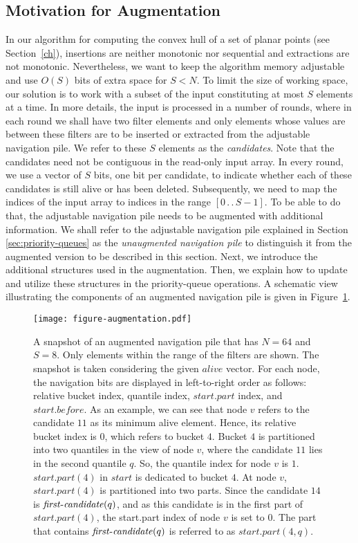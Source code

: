 \documentclass[final,onetabnum,onefignum,onethmnum]{siamltex}
\newcommand{\FirstCandidate}{\mbox{$\mathit{first}\mbox{\rm -}\mathit{candidate}$}}
\newcommand{\twodots}{\,.\,.\,}
\begin{document}
\subsection{Motivation for Augmentation} 
In our algorithm for computing the convex hull of a set of planar points (see Section~\ref{ch}), 
insertions are neither monotonic nor sequential and extractions are not monotonic. 
Nevertheless, we want to keep the algorithm memory adjustable and use $O(S)$ bits of extra
space for $S < N$.  To limit the size of working space, our
solution is to work with a subset of the input constituting at most
$S$ elements at a time. In more details, the input is processed in a
number of rounds, where in each round we shall have two filter
elements and only elements whose values are between these filters are
to be inserted or extracted from the adjustable navigation pile. We
refer to these $S$ elements as the \emph{candidates}.  Note that
the candidates need not be contiguous in the read-only input array.  
In every round, we use a vector of $S$ bits, one bit per candidate, 
to indicate whether each of these candidates is still alive or has been deleted.
Subsequently, we need to map the indices of the input array to
indices in the range $[0 \twodots S-1]$. To be able to do that,
the adjustable navigation pile needs to be augmented with additional
information. We shall refer to the adjustable navigation pile explained in
Section \ref{sec:priority-queues} as the \emph{unaugmented navigation
  pile} to distinguish it from the augmented version to be described
in this section.  Next, we introduce the additional structures used in
the augmentation. Then, we explain how to update and utilize these
structures in the priority-queue operations.  A schematic view
illustrating the components of an augmented navigation pile is given in
Figure~\ref{ANP}.

\begin{figure}[t!]
\centerline{\texttt{[image: figure-augmentation.pdf]}}
\caption{A snapshot of an augmented navigation pile that has $N = 64$
  and $S = 8$. Only elements within the range of the filters are
  shown. The snapshot is taken considering the given $\mathit{alive}$
  vector. For each node, the navigation bits are displayed in
  left-to-right order as follows: relative bucket index, quantile
  index, $\mathit{start.part}$ index, and $\mathit{start.before}$. As
  an example, we can see that node $v$ refers to the candidate $11$ as
  its minimum alive element. Hence, its relative bucket index is $0$,
  which refers to bucket $4$. Bucket $4$ is partitioned into two
  quantiles in the view of node $v$, where the candidate $11$ lies in
  the second quantile $q$. So, the quantile index for node $v$ is
  $1$. $\mathit{start.part}(4)$ in $\mathit{start}$ is dedicated to
  bucket $4$. At node $v$, $\mathit{start.part}(4)$ is partitioned
  into two parts.  Since the candidate $14$ is 
  $\FirstCandidate(q)$, and as this candidate is in the
  first part of $\mathit{start.part}(4)$, the start.part index of node
  $v$ is set to $0$.  The part that contains $\FirstCandidate(q)$
  is referred to as $\mathit{start.part}(4,q)$.}	
\label{ANP}
\vspace{-0.5cm}
\end{figure}
\end{document}
